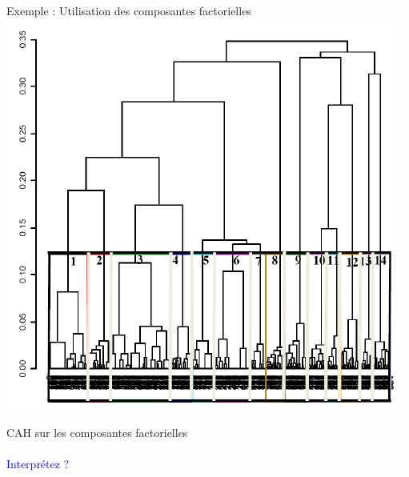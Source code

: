 \documentclass[10pt]{beamer}
\begin{document}
\begin{frame}{Exemple : Utilisation des composantes factorielles}
\centering 
 \includegraphics[scale=.4]{ACM4} 

\centering CAH sur les composantes factorielles \\~\\

\textcolor{blue}{Interprétez ?}

\end{frame}

 
\end{document}
